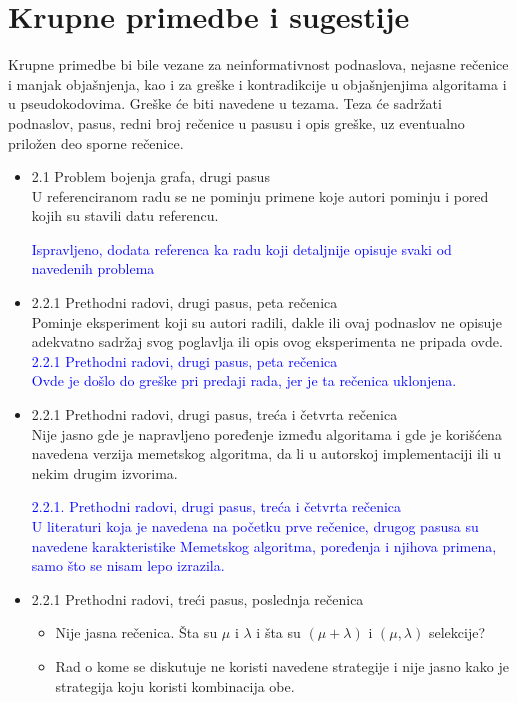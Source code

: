 \documentclass[a4paper]{report}
\newcommand{\odgovor}[1]{\textcolor{blue}{#1}}
\begin{document}
\section{Krupne primedbe i sugestije}
Krupne primedbe bi bile vezane za neinformativnost podnaslova, nejasne rečenice i manjak objašnjenja, kao i za greške i kontradikcije u objašnjenjima algoritama i u pseudokodovima. Greške će biti navedene u tezama. Teza će sadržati podnaslov, pasus, redni broj rečenice u pasusu i opis greške, uz eventualno priložen deo sporne rečenice.
\begin{itemize}
    \item 2.1 Problem bojenja grafa, drugi pasus \\
    U referenciranom radu se ne pominju primene koje autori pominju i pored kojih su stavili datu referencu.
    
    \odgovor{Ispravljeno, dodata referenca ka radu koji detaljnije opisuje svaki od navedenih problema}
    \item 2.2.1 Prethodni radovi, drugi pasus, peta rečenica \\
    Pominje eksperiment koji su autori radili, dakle ili ovaj podnaslov ne opisuje adekvatno sadržaj svog poglavlja ili opis ovog eksperimenta ne pripada ovde. \\
    \odgovor{ 2.2.1 Prethodni radovi, drugi pasus, peta rečenica \\
    Ovde je došlo do greške pri predaji rada, jer je ta rečenica uklonjena.} \\
    
    \item 2.2.1 Prethodni radovi, drugi pasus, treća i četvrta rečenica \\
    Nije jasno gde je napravljeno poređenje između algoritama i gde je korišćena navedena verzija memetskog algoritma, da li u autorskoj implementaciji ili u nekim drugim izvorima.
    
    \odgovor{ 2.2.1. Prethodni radovi, drugi pasus, treća i četvrta rečenica \\
    U literaturi koja je navedena na početku prve rečenice, drugog pasusa su navedene karakteristike Memetskog algoritma, poređenja i njihova primena, samo što se nisam lepo izrazila.}
     


    
    \item 2.2.1 Prethodni radovi, treći pasus, poslednja rečenica
        \begin{itemize}
            \item Nije jasna rečenica. Šta su $\mu$ i $\lambda$ i šta su $(\mu + \lambda)$ i $(\mu, \lambda)$ selekcije?
            \item Rad o kome se diskutuje ne koristi navedene strategije i nije jasno kako je strategija koju koristi kombinacija obe.
        \end{itemize}
        

\end{itemize}
\end{document}
